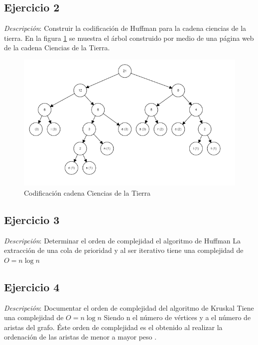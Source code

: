         \subsection{Ejercicio 2}
            \textit{Descripción}: Construir la codificación de Huffman para la cadena ciencias de la tierra.
            \newline
            En la figura \ref{fig:huffman1} se muestra el árbol construido por medio de una página web de la cadena Ciencias de la Tierra.
            \begin{figure}[htp!]
                \centering
                \includegraphics[width=0.7 \textwidth]{Images/HUFFMAN/HUFFMAN_CT.png}  
                \caption{Codificación cadena Ciencias de la Tierra}
                \label{fig:huffman1}
            \end{figure}
    
                
        \subsection{Ejercicio 3}
            \textit{Descripción}: Determinar el orden de complejidad el algoritmo de Huffman
            \newline
            La extracción de una cola de prioridad y al ser iterativo tiene una complejidad de \(O = n\log{n}\) 
            

        \subsection{Ejercicio 4}
            \textit{Descripción}: Documentar el orden de complejidad del algoritmo de Kruskal
            \newline
            Tiene una complejidad de \(O = n\log{n}\) Siendo n el número de vértices y a el número de aristas del grafo. Éste orden de complejidad es el obtenido al realizar la ordenación de las aristas de menor a mayor peso \cite{Kruskal}.
            
